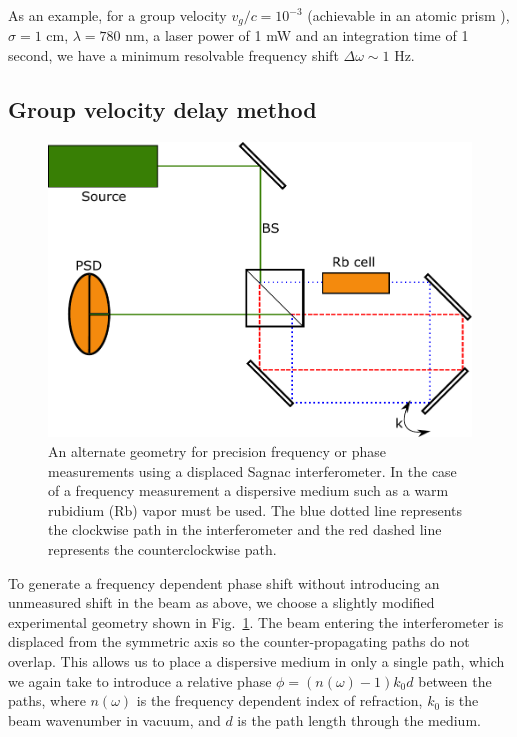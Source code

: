 As an example, for a group velocity $v_g/c = 10^{-3}$ (achievable in an atomic prism \cite{Starling2012}), $\sigma = 1$ cm,  $\lambda = 780$ nm, a laser power of 1 mW and an integration time of 1 second, we have a minimum resolvable frequency shift $\Delta \omega \sim 1$ Hz.
\subsection{Group velocity delay method}
\begin{figure}
	\includegraphics[scale=.5]{InverseWeakValueNoise/Figures/displaced_sagnac.pdf}
	\caption{An alternate geometry for precision frequency or phase measurements using a displaced Sagnac interferometer.  In the case of a frequency measurement a dispersive medium such as a warm rubidium (Rb) vapor must be used.  The blue dotted line represents the clockwise path in the interferometer and the red dashed line represents the counterclockwise path.}\label{fig:displaced sagnac}
\end{figure}
To generate a frequency dependent phase shift without introducing an unmeasured shift in the beam as above, we choose a slightly modified experimental geometry shown in Fig.~\ref{fig:displaced sagnac}.  The beam entering the interferometer is displaced from the symmetric axis so the counter-propagating paths do not overlap.  This allows us to place a dispersive medium in only a single path, which we again take to introduce a relative phase $\phi = (n(\omega)-1)k_0 d$ between the paths, where $n(\omega)$ is the frequency dependent index of refraction, $k_0$ is the beam wavenumber in vacuum, and $d$ is the path length through the medium.   

